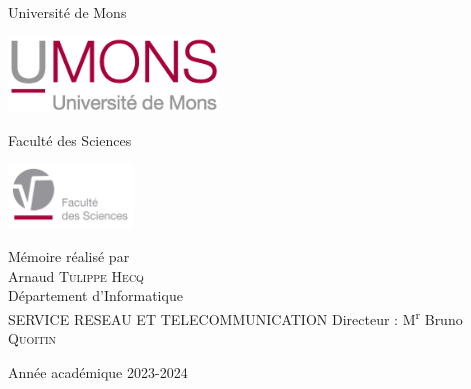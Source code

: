 \documentclass[12pt,a4paper,oneside, titlepage]{report}
\begin{document}
\begin{titlepage}

\begin{center}
\textnormal{\Large{Universit\'e de Mons}}\\[0.3em]

\begin{center}
\includegraphics[height=2cm]{UMONS-logo.jpg}
\end{center}

\textnormal{\Large{Facult\'e des Sciences}}\\[0.3em]

\begin{center}
\includegraphics[height=1.7cm]{FS-logo.jpg}
\end{center}


\end{center}
\vspace*{2cm}
\begin{center}
\end{center}
\vspace*{1.5cm}


 
\large{
\begin{center}
M\'emoire r\'ealis\'e par\\
 Arnaud \textsc{Tulippe Hecq}\\
 \vspace*{1.5cm}
\textnormal{\Large{D\'epartement d'Informatique}}\\[0.3em]
\textnormal{\Large{SERVICE RESEAU ET TELECOMMUNICATION}}
Directeur : M\textsuperscript{r} Bruno \textsc{Quoitin}  

\end{center}}

\vfill

\begin{center}
Ann\'ee acad\'emique 2023-2024
\end{center}

\end{titlepage}
\end{document}
